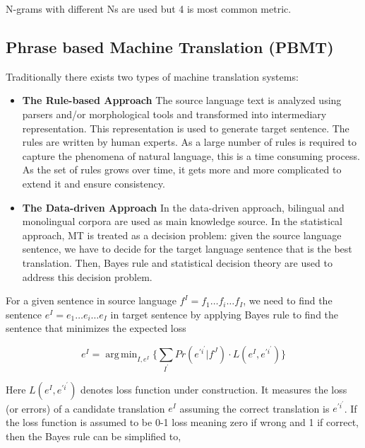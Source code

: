 \documentclass[a4paper]{article}
\DeclareMathOperator*{\argmin}{arg\,min}
\begin{document}
N-grams with different Ns are used but 4 is most common metric.


\subsection{Phrase based Machine Translation (PBMT)}

Traditionally there exists two types of machine translation systems:

\begin{itemize}

  \item \textbf{The Rule-based Approach}
        The  source language text is analyzed using parsers and/or morphological
        tools   and   transformed  into    intermediary   representation.   This
        representation  is  used  to  generate  target  sentence.  The rules are
        written  by human  experts. As  a large number of  rules is  required to
        capture  the  phenomena  of natural language,  this is a  time consuming
        process.  As the set of rules grows over time, it gets more and more
        complicated to extend it and ensure consistency.

  \item \textbf{The Data-driven Approach}
        In the data-driven  approach, bilingual and monolingual corpora are used
        as main knowledge source.  In the statistical approach, MT is treated as
        a  decision problem:  given the  source  language  sentence,  we have to
        decide  for the  target language  sentence that is the best translation.
        Then,  Bayes rule  and  statistical  decision theory are used to address
        this decision problem.
\end{itemize}


For a given sentence in source language $f^{I} = f_1\ldots f_i\ldots f_{I} $, we
need to find the sentence $e^{I} = e_1\ldots e_i\ldots e_{I}$ in target sentence
by applying Bayes rule to find the sentence that minimizes the expected loss


\begin{equation*}
e^{I} =  \argmin_{I,e^{I}} \Bigg\{
  \sum_{I^{'} } Pr(e^{\prime i^\prime} | f^J) \cdot L(e^I, e^{\prime i^\prime})
\Bigg\}
\end{equation*}


Here  $L(e^I, e^{\prime i^\prime})$ denotes loss function under construction. It
measures  the loss  (or errors) of a  candidate translation $e^{I}$ assuming the
correct translation is $e^{\prime i^\prime}$. If the loss function is assumed to
be 0-1  loss meaning  zero if wrong and 1 if correct, then the Bayes rule can be
simplified to,
\end{document}

